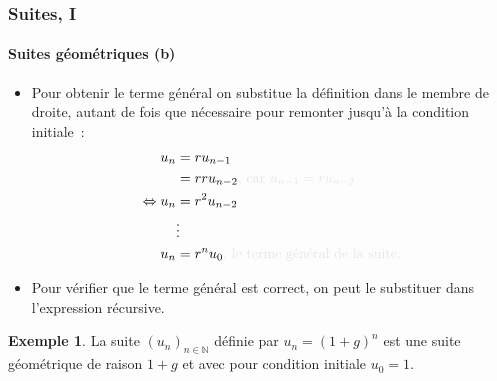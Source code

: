 \documentclass[10pt,notheorems]{beamer}
\theoremstyle{plain}
\theoremstyle{definition} %
\newtheorem{example}{Exemple}
\begin{document}
\begin{frame}
  \frametitle{Suites, I}
  \framesubtitle{Suites géométriques (b)}
  \hypertarget{slide_suites_geometriques_2}{}

  \bigskip

  \begin{itemize}

  \item Pour obtenir le terme général on substitue la définition dans le membre de droite, autant de fois que nécessaire pour remonter jusqu'à la condition initiale~:
    \[
      \begin{split}
        u_n &= r u_{n-1}\\
        &= r r u_{n-2} {\color{gray}\text{, car }u_{n-1}=r u_{n-2}}\\
        \Leftrightarrow u_n &= r^2 u_{n-2}\\
        &\vdots\\
        u_n &= r^nu_0 {\color{gray}\text{, le terme général de la suite.}}
      \end{split}
    \]

    \bigskip

  \item Pour vérifier que le terme général est correct, on peut le substituer dans l'expression récursive.\newline

  \end{itemize}

  \begin{example}
    La suite $(u_n)_{n\in\mathbb N}$ définie par $u_n = (1+g)^n$ est une suite géométrique de raison $1+g$ et avec pour condition initiale $u_0=1$.
  \end{example}

\end{frame}
\end{document}
